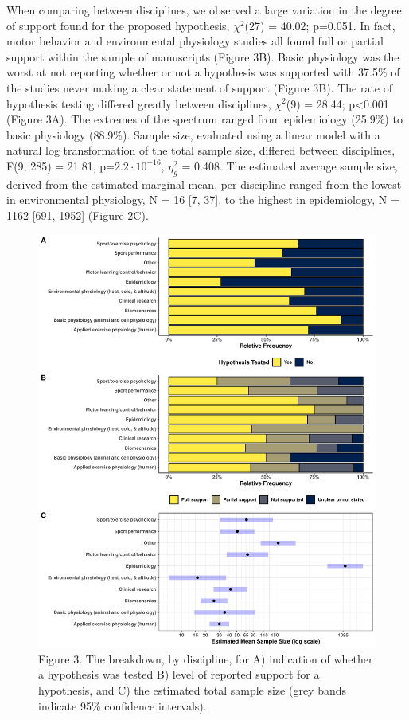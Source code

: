 \documentclass[]{cik}%
\begin{document}
When comparing between disciplines, we observed a large variation in the
degree of support found for the proposed hypothesis, \(\chi^2\)(27) =
40.02; p=0.051. In fact, motor behavior and environmental physiology
studies all found full or partial support within the sample of
manuscripts (Figure 3B). Basic physiology was the worst at not reporting
whether or not a hypothesis was supported with 37.5\% of the studies
never making a clear statement of support (Figure 3B). The rate of
hypothesis testing differed greatly between disciplines, \(\chi^2\)(9) =
28.44; p\textless0.001 (Figure 3A). The extremes of the spectrum ranged
from epidemiology (25.9\%) to basic physiology (88.9\%). Sample size,
evaluated using a linear model with a natural log transformation of the
total sample size, differed between disciplines, F(9, 285) = 21.81,
p=\(2.2 \cdot 10^{-16}\), \(\eta^2_g\) = 0.408. The estimated average
sample size, derived from the estimated marginal mean, per discipline
ranged from the lowest in environmental physiology, N = 16 {[}7, 37{]},
to the highest in epidemiology, N = 1162 {[}691, 1952{]} (Figure 2C).

\newpage

\begin{figure}[H]
\includegraphics[width=1\linewidth]{figure3} \caption{Figure 3. The breakdown, by discipline, for A) indication of whether a hypothesis was tested B) level of reported support for a hypothesis,  and C) the estimated total sample size (grey bands indicate 95\% confidence intervals).}\label{fig:fig3}
\end{figure}
\end{document}
